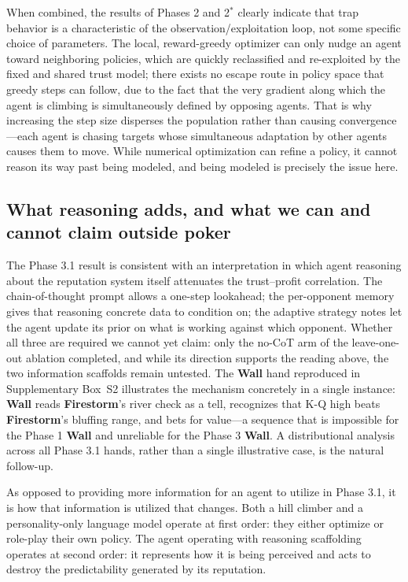 \documentclass[journal]{IEEEtran}
\newcommand{\arch}[1]{\textbf{#1}}
\begin{document}
When combined, the results of Phases 2 and 2$^{*}$ clearly indicate that trap
behavior is a characteristic of the observation/exploitation loop, not some
specific choice of parameters. The local, reward-greedy optimizer can only nudge
an agent toward neighboring policies, which are quickly reclassified and
re-exploited by the fixed and shared trust model; there exists no escape route in
policy space that greedy steps can follow, due to the fact that the very gradient
along which the agent is climbing is simultaneously defined by opposing agents.
That is why increasing the step size disperses the population rather than causing
convergence---each agent is chasing targets whose simultaneous adaptation by
other agents causes them to move. While numerical optimization can refine a
policy, it cannot reason its way past being modeled, and being modeled is
precisely the issue here.


\FloatBarrier

\subsection{What reasoning adds, and what we can and cannot claim
outside poker}
The Phase 3.1 result is consistent with an interpretation in
which agent reasoning about the reputation system itself
attenuates the trust--profit correlation. The chain-of-thought
prompt allows a one-step lookahead; the per-opponent memory
gives that reasoning concrete data to condition on; the
adaptive strategy notes let the agent update its prior on what
is working against which opponent. Whether all three are required we
cannot yet claim: only the no-CoT arm of the leave-one-out ablation
completed, and while its direction supports the reading above, the two
information scaffolds remain untested. The \arch{Wall} hand reproduced in Supplementary Box~S2
illustrates the mechanism concretely in a single instance:
\arch{Wall} reads \arch{Firestorm}'s river check as a tell,
recognizes that K-Q high beats \arch{Firestorm}'s bluffing
range, and bets for value---a sequence that is impossible for
the Phase 1 \arch{Wall} and unreliable for the Phase 3
\arch{Wall}. A distributional analysis across all Phase 3.1
hands, rather than a single illustrative case, is the natural
follow-up.

As opposed to providing more information for an agent to utilize in
Phase 3.1, it is how that information is utilized that changes. Both a hill
climber and a personality-only language model operate at first order: they
either optimize or role-play their own policy. The agent operating with
reasoning scaffolding operates at second order: it represents how it is being
perceived and acts to destroy the predictability generated by its reputation.
\end{document}

